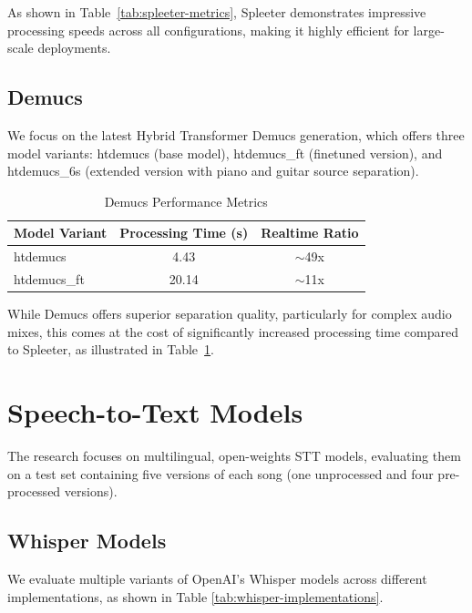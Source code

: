 \documentclass[10pt]{article}
\begin{document}
As shown in Table~\ref{tab:spleeter-metrics}, Spleeter demonstrates impressive processing speeds across all configurations, making it highly efficient for large-scale deployments.

\subsection{Demucs}
We focus on the latest Hybrid Transformer Demucs generation, which offers three model variants: htdemucs (base model), htdemucs\_ft (finetuned version), and htdemucs\_6s (extended version with piano and guitar source separation).

\begin{table}[ht]
\centering
\caption{Demucs Performance Metrics}
\label{tab:demucs-metrics}
\begin{tabular}{lcc}
\toprule
\textbf{Model Variant} & \textbf{Processing Time (s)} & \textbf{Realtime Ratio} \\
\midrule
htdemucs & 4.43 & $\sim$49x \\
htdemucs\_ft & 20.14 & $\sim$11x \\
\bottomrule
\end{tabular}
\end{table}

While Demucs offers superior separation quality, particularly for complex audio mixes, this comes at the cost of significantly increased processing time compared to Spleeter, as illustrated in Table~\ref{tab:demucs-metrics}.

\section{Speech-to-Text Models}
The research focuses on multilingual, open-weights STT models, evaluating them on a test set containing five versions of each song (one unprocessed and four pre-processed versions).

\subsection{Whisper Models}
We evaluate multiple variants of OpenAI's Whisper models across different implementations, as shown in Table \ref{tab:whisper-implementations}.
\end{document}

